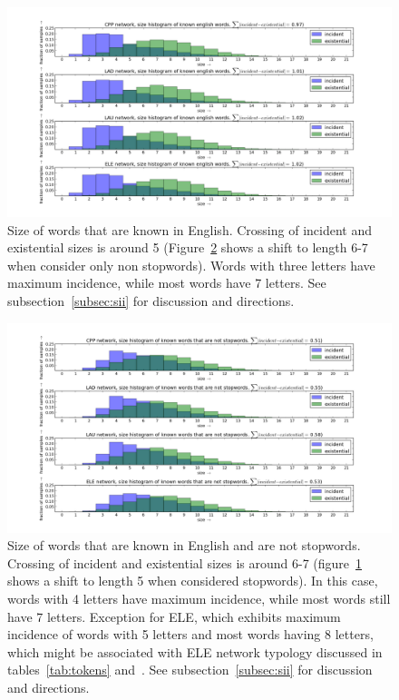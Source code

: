\documentclass[%
 aip,
 jmp,%
 amsmath,amssymb,
 reprint,%
 floatfix,
]{revtex4-1}
\begin{document}
\begin{figure}[h!]
    \centering
    \includegraphics[width=\textwidth]{figs/kw}
    \caption{Size of words that are known in English. Crossing of incident and existential sizes is around 5 (Figure~\ref{fig:kwnsw} shows a shift to length 6-7 when consider only non stopwords). Words with three letters have maximum incidence, while most words have 7 letters. See subsection~\ref{subsec:sii} for discussion and directions.}
    \label{fig:kw}
\end{figure}


\begin{figure}[h!]
    \centering
    \includegraphics[width=\textwidth]{figs/kwnsw}
    \caption{Size of words that are known in English and are not stopwords. Crossing of incident and existential sizes is around 6-7 (figure~\ref{fig:kw} shows a shift to length 5 when considered stopwords). In this case, words with 4 letters have maximum incidence, while most words still have 7 letters. Exception for ELE, which exhibits maximum incidence of words with 5 letters and most words having 8 letters, which might be associated with ELE network typology discussed in tables~\ref{tab:tokens} and~\label{tab:caracteres}. See subsection~\ref{subsec:sii} for discussion and directions.}
    \label{fig:kwnsw}
\end{figure}
\end{document}
